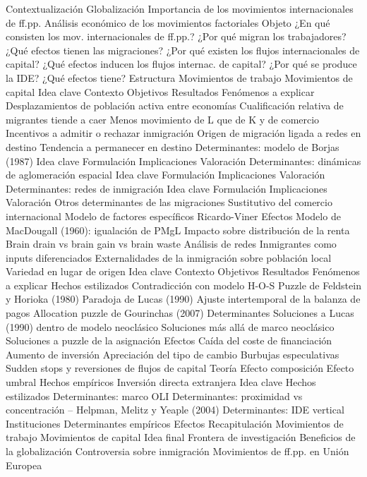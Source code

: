 \documentclass{nuevotema}
\begin{document}
\begin{esquema}[enumerate]
	\1[] 
		\2 Contextualización
			\3 Globalización
			\3 Importancia de los movimientos internacionales de ff.pp.
			\3 Análisis económico de los movimientos factoriales
		\2 Objeto
			\3 ¿En qué consisten los mov. internacionales de ff.pp.?
			\3 ¿Por qué migran los trabajadores?
			\3 ¿Qué efectos tienen las migraciones?
			\3 ¿Por qué existen los flujos internacionales de capital?
			\3 ¿Qué efectos inducen los flujos internac. de capital?
			\3 ¿Por qué se produce la IDE?
			\3 ¿Qué efectos tiene?
		\2 Estructura
			\3 Movimientos de trabajo
			\3 Movimientos de capital
	\1 
		\2 Idea clave
			\3 Contexto
			\3 Objetivos
			\3 Resultados
		\2 Fenómenos a explicar
			\3 Desplazamientos de población activa entre economías
			\3 Cualificación relativa de migrantes tiende a caer
			\3 Menos movimiento de L que de K y de comercio
			\3 Incentivos a admitir o rechazar inmigración
			\3 Origen de migración ligada a redes en destino
			\3 Tendencia a permanecer en destino
		\2 Determinantes: modelo de Borjas (1987)
			\3 Idea clave
			\3 Formulación
			\3 Implicaciones
			\3 Valoración
		\2 Determinantes: dinámicas de aglomeración espacial
			\3 Idea clave
			\3 Formulación
			\3 Implicaciones
			\3 Valoración
		\2 Determinantes: redes de inmigración
			\3 Idea clave
			\3 Formulación
			\3 Implicaciones
			\3 Valoración
		\2 Otros determinantes de las migraciones
			\3 Sustitutivo del comercio internacional
			\3 Modelo de factores específicos Ricardo-Viner
		\2 Efectos
			\3 Modelo de MacDougall (1960): igualación de PMgL
			\3 Impacto sobre distribución de la renta
			\3 Brain drain vs brain gain vs brain waste
			\3 Análisis de redes
			\3 Inmigrantes como inputs diferenciados
			\3 Externalidades de la inmigración sobre población local
			\3 Variedad en lugar de origen
	\1 
		\2 Idea clave
			\3 Contexto
			\3 Objetivos
			\3 Resultados
		\2 Fenómenos a explicar
			\3 Hechos estilizados
			\3 Contradicción con modelo H-O-S
			\3 Puzzle de Feldstein y Horioka (1980)
			\3 Paradoja de Lucas (1990)
			\3 Ajuste intertemporal de la balanza de pagos
			\3 Allocation puzzle de Gourinchas (2007)
		\2 Determinantes
			\3 Soluciones a Lucas (1990) dentro de modelo neoclásico
			\3 Soluciones más allá de marco neoclásico
			\3 Soluciones a puzzle de la asignación
		\2 Efectos
			\3 Caída del coste de financiación
			\3 Aumento de inversión
			\3 Apreciación del tipo de cambio
			\3 Burbujas especulativas
			\3 Sudden stops y reversiones de flujos de capital
			\3 Teoría
			\3 Efecto composición
			\3 Efecto umbral
			\3 Hechos empíricos
		\2 Inversión directa extranjera
			\3 Idea clave
			\3 Hechos estilizados
			\3 Determinantes: marco OLI
			\3 Determinantes: proximidad vs concentración -- Helpman, Melitz y Yeaple (2004)
			\3 Determinantes: IDE vertical
			\3 Instituciones
			\3 Determinantes empíricos
			\3 Efectos
	\1[] 
		\2 Recapitulación
			\3 Movimientos de trabajo
			\3 Movimientos de capital
		\2 Idea final
			\3 Frontera de investigación
			\3 Beneficios de la globalización
			\3 Controversia sobre inmigración
			\3 Movimientos de ff.pp. en Unión Europea


\end{esquema}
\end{document}
